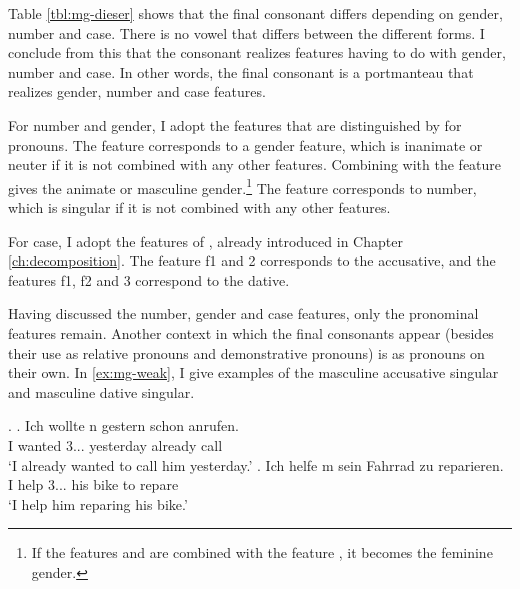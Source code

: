 Table \ref{tbl:mg-dieser} shows that the final consonant differs depending on gender, number and case. There is no vowel that differs between the different forms. I conclude from this that the consonant realizes features having to do with gender, number and case. In other words, the final consonant is a portmanteau that realizes gender, number and case features.

For number and gender, I adopt the features that are distinguished by \citet{harley2002} for pronouns. The feature  corresponds to a gender feature, which is inanimate or neuter if it is not combined with any other features. Combining  with the feature  gives the animate or masculine gender.\footnote{
If the features  and  are combined with the feature , it becomes the feminine gender.
}
The feature  corresponds to number, which is singular if it is not combined with any other features.

For case, I adopt the features of \citet{caha2009}, already introduced in Chapter \ref{ch:decomposition}. The feature \ac{f}1 and 2 corresponds to the accusative, and the features \ac{f}1, \ac{f}2 and 3 correspond to the dative.

Having discussed the number, gender and case features, only the pronominal features remain. Another context in which the final consonants appear (besides their use as relative pronouns and demonstrative pronouns) is as pronouns on their own. In \ref{ex:mg-weak}, I give examples of the masculine accusative singular and masculine dative singular.

\ex.\label{ex:mg-weak}
\ag. Ich wollte n gestern schon anrufen.\\
 I wanted 3... yesterday already call\\
 `I already wanted to call him yesterday.'
\bg. Ich helfe m sein Fahrrad zu reparieren.\\
 I help 3... his bike to repare\\
 `I help him reparing his bike.'

